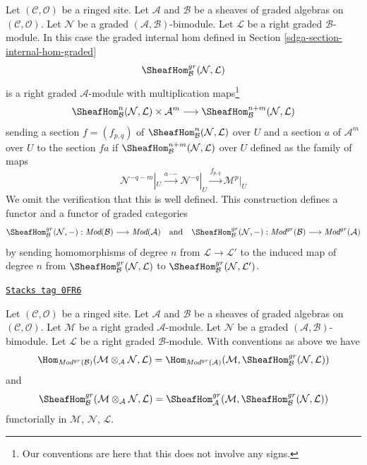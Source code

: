 \medskip\noindent
Let $(\mathcal{C}, \mathcal{O})$ be a ringed site. Let $\mathcal{A}$
and $\mathcal{B}$ be a sheaves of graded algebras on
$(\mathcal{C}, \mathcal{O})$. Let $\mathcal{N}$ be a
graded $(\mathcal{A}, \mathcal{B})$-bimodule. Let
$\mathcal{L}$ be a right graded $\mathcal{B}$-module.
In this case the graded internal hom
defined in Section \ref{sdga-section-internal-hom-graded}
$$
\SheafHom_\mathcal{B}^{gr}(\mathcal{N}, \mathcal{L})
$$
is a right graded $\mathcal{A}$-module with
multiplication maps\footnote{Our conventions are here
that this does not involve any signs.}
$$
\SheafHom^n_\mathcal{B}(\mathcal{N}, \mathcal{L})
\times \mathcal{A}^m
\longrightarrow
\SheafHom^{n + m}_\mathcal{B}(\mathcal{N}, \mathcal{L})
$$
sending a section $f = (f_{p,q})$ of
$\SheafHom^n_\mathcal{B}(\mathcal{N}, \mathcal{L})$ over $U$
and a section $a$ of $\mathcal{A}^m$ over $U$ to the section
$f a$ if $\SheafHom^{n + m}_\mathcal{B}(\mathcal{N}, \mathcal{L})$ over $U$
defined as the family of maps
$$
\mathcal{N}^{-q - m}|_U \xrightarrow{a \cdot -}
\mathcal{N}^{-q}|_U \xrightarrow{f_{p, q}}
\mathcal{M}^p|_U
$$
We omit the verification that this is well defined. This construction
defines a functor and a functor of graded categories
$$
\SheafHom_\mathcal{B}^{gr}(\mathcal{N}, -) :
\textit{Mod}(\mathcal{B})
\longrightarrow
\textit{Mod}(\mathcal{A})
\quad\text{and}\quad
\SheafHom_\mathcal{B}^{gr}(\mathcal{N}, -) :
\textit{Mod}^{gr}(\mathcal{B})
\longrightarrow
\textit{Mod}^{gr}(\mathcal{A})
$$
by sending homomorphisms of degree $n$ from $\mathcal{L} \to \mathcal{L}'$
to the induced map of degree $n$ from
$\SheafHom_\mathcal{B}^{gr}(\mathcal{N}, \mathcal{L})$ to
$\SheafHom_\mathcal{B}^{gr}(\mathcal{N}, \mathcal{L}')$.

\begin{lemma}
\label{sdga-lemma-tensor-hom-adjunction-gr}
\href{https://stacks.math.columbia.edu/tag/0FR6}{\texttt{Stacks tag 0FR6}}

Let $(\mathcal{C}, \mathcal{O})$ be a ringed site. Let $\mathcal{A}$
and $\mathcal{B}$ be a sheaves of graded algebras on
$(\mathcal{C}, \mathcal{O})$. Let $\mathcal{M}$ be a right
graded $\mathcal{A}$-module. Let $\mathcal{N}$ be a
graded $(\mathcal{A}, \mathcal{B})$-bimodule. Let $\mathcal{L}$
be a right graded $\mathcal{B}$-module. With conventions as above
we have
$$
\Hom_{\textit{Mod}^{gr}(\mathcal{B})}(
\mathcal{M} \otimes_\mathcal{A} \mathcal{N}, \mathcal{L}) =
\Hom_{\textit{Mod}^{gr}(\mathcal{A})}(
\mathcal{M}, \SheafHom_\mathcal{B}^{gr}(\mathcal{N}, \mathcal{L}))
$$
and
$$
\SheafHom_\mathcal{B}^{gr}(
\mathcal{M} \otimes_\mathcal{A} \mathcal{N}, \mathcal{L}) =
\SheafHom_\mathcal{A}^{gr}(
\mathcal{M}, \SheafHom_\mathcal{B}^{gr}(\mathcal{N}, \mathcal{L}))
$$
functorially in $\mathcal{M}$, $\mathcal{N}$, $\mathcal{L}$.
\end{lemma}

